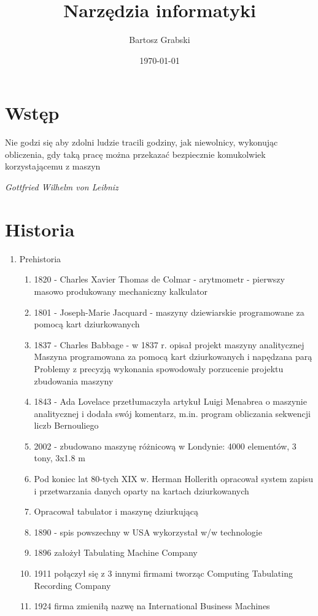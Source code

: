 \documentclass[a4paper,twoside,onecolumn]{report}
\author{Bartosz Grabski}
\title{Narzędzia informatyki}
\date{\today}
\begin{document}
 	\maketitle

	\section{Wstęp}
		\epigraph{
			Nie godzi się aby zdolni ludzie tracili godziny, jak niewolnicy, wykonując obliczenia, gdy taką pracę można przekazać bezpiecznie komukolwiek korzystającemu z maszyn
		}{
			\textit{Gottfried Wilhelm von Leibniz 
		}}
	
	\section{Historia}
		\begin{enumerate}[-]
			\item Prehistoria
				\begin{enumerate}[*]
					\item 1820 - Charles Xavier Thomas de Colmar - arytmometr - pierwszy masowo produkowany mechaniczny kalkulator
					\item 1801 - Joseph-Marie Jacquard - maszyny dziewiarskie programowane za pomocą kart dziurkowanych
					\item 1837 - Charles Babbage - w 1837 r. opisał projekt maszyny analitycznej Maszyna programowana za pomocą kart dziurkowanych i napędzana parą 								Problemy z precyzją wykonania spowodowały porzucenie projektu zbudowania maszyny
					\item 1843 - Ada Lovelace przetłumaczyła artykuł Luigi Menabrea o maszynie analitycznej i dodała swój komentarz, m.in. program obliczania sekwencji liczb 								Bernouliego
					\item 2002 - zbudowano maszynę różnicową w Londynie: 4000 elementów, 3 tony, 3x1.8 m
					\item Pod koniec lat 80-tych XIX w. Herman Hollerith opracował system zapisu i przetwarzania danych oparty na kartach dziurkowanych
					\item Opracował tabulator i maszynę dziurkującą
					\item 1890 - spis powszechny w USA wykorzystał w/w technologie
					\item 1896 założył Tabulating Machine Company
					\item 1911 połączył się z 3 innymi firmami tworząc Computing Tabulating Recording Company
					\item 1924 firma zmieniłą nazwę na International Business Machines

\end{enumerate}
\end{enumerate}
\end{document}
